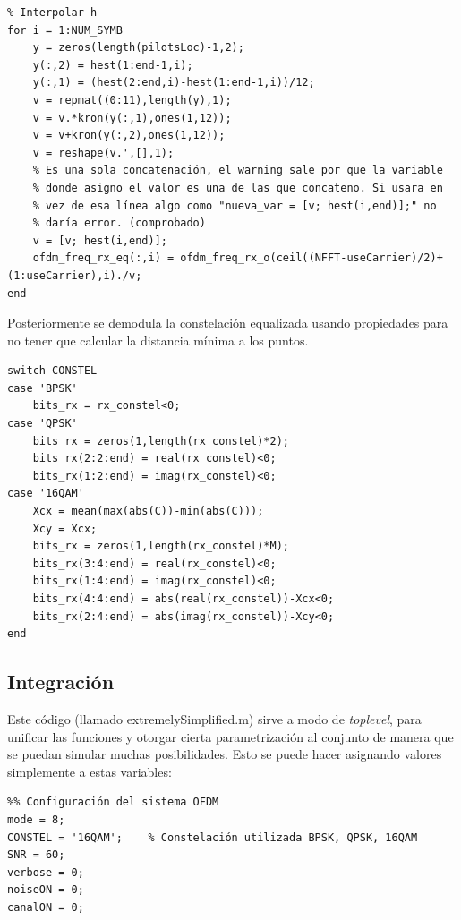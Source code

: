 \documentclass[11pt]{scrartcl} %
\begin{document}
\begin{preview}
\begin{verbatim}
% Interpolar h
for i = 1:NUM_SYMB
	y = zeros(length(pilotsLoc)-1,2);
	y(:,2) = hest(1:end-1,i);
	y(:,1) = (hest(2:end,i)-hest(1:end-1,i))/12;
	v = repmat((0:11),length(y),1);
	v = v.*kron(y(:,1),ones(1,12)); 
	v = v+kron(y(:,2),ones(1,12));
	v = reshape(v.',[],1);
	% Es una sola concatenación, el warning sale por que la variable
	% donde asigno el valor es una de las que concateno. Si usara en
	% vez de esa línea algo como "nueva_var = [v; hest(i,end)];" no
	% daría error. (comprobado)
	v = [v; hest(i,end)];
	ofdm_freq_rx_eq(:,i) = ofdm_freq_rx_o(ceil((NFFT-useCarrier)/2)+(1:useCarrier),i)./v;
end
\end{verbatim}

Posteriormente se demodula la constelación equalizada usando propiedades para no tener que calcular la distancia mínima a los puntos.

\begin{verbatim}
switch CONSTEL
case 'BPSK'
	bits_rx = rx_constel<0;
case 'QPSK'
	bits_rx = zeros(1,length(rx_constel)*2);
	bits_rx(2:2:end) = real(rx_constel)<0;
	bits_rx(1:2:end) = imag(rx_constel)<0;
case '16QAM'
	Xcx = mean(max(abs(C))-min(abs(C))); 
	Xcy = Xcx;
	bits_rx = zeros(1,length(rx_constel)*M);
	bits_rx(3:4:end) = real(rx_constel)<0;
	bits_rx(1:4:end) = imag(rx_constel)<0;
	bits_rx(4:4:end) = abs(real(rx_constel))-Xcx<0;
	bits_rx(2:4:end) = abs(imag(rx_constel))-Xcy<0;
end
\end{verbatim}

\subsection{Integración}

Este código (llamado extremelySimplified.m) sirve a modo de \emph{toplevel}, para unificar las funciones y otorgar cierta parametrización al conjunto de manera que se puedan simular muchas posibilidades. Esto se puede hacer asignando valores simplemente a estas variables:

\begin{verbatim}
%% Configuración del sistema OFDM
mode = 8;
CONSTEL = '16QAM';    % Constelación utilizada BPSK, QPSK, 16QAM
SNR = 60; 
verbose = 0;
noiseON = 0;
canalON = 0;
\end{verbatim}


\end{preview}
\end{document}
